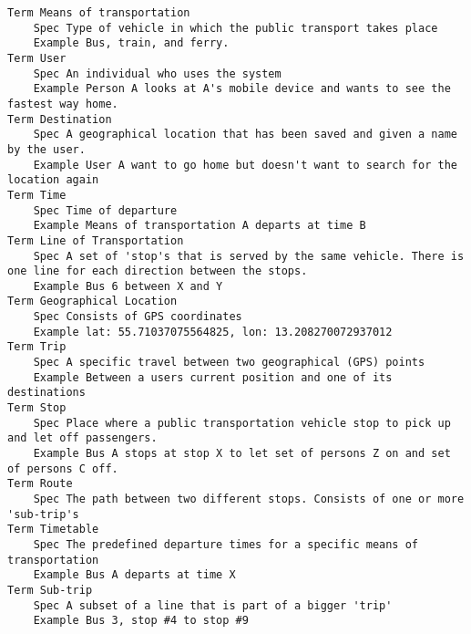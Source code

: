 

\begin{lstlisting}
Term Means of transportation
	Spec Type of vehicle in which the public transport takes place
	Example Bus, train, and ferry.
Term User
	Spec An individual who uses the system
	Example Person A looks at A's mobile device and wants to see the fastest way home.
Term Destination
	Spec A geographical location that has been saved and given a name by the user.
	Example User A want to go home but doesn't want to search for the location again
Term Time
	Spec Time of departure
	Example Means of transportation A departs at time B
Term Line of Transportation
	Spec A set of 'stop's that is served by the same vehicle. There is one line for each direction between the stops.
	Example Bus 6 between X and Y
Term Geographical Location
	Spec Consists of GPS coordinates
	Example lat: 55.71037075564825, lon: 13.208270072937012
Term Trip
	Spec A specific travel between two geographical (GPS) points
	Example Between a users current position and one of its destinations
Term Stop
	Spec Place where a public transportation vehicle stop to pick up and let off passengers.
	Example Bus A stops at stop X to let set of persons Z on and set of persons C off.
Term Route
	Spec The path between two different stops. Consists of one or more 'sub-trip's
Term Timetable
	Spec The predefined departure times for a specific means of transportation
	Example Bus A departs at time X
Term Sub-trip
	Spec A subset of a line that is part of a bigger 'trip'
	Example Bus 3, stop #4 to stop #9

\end{lstlisting}